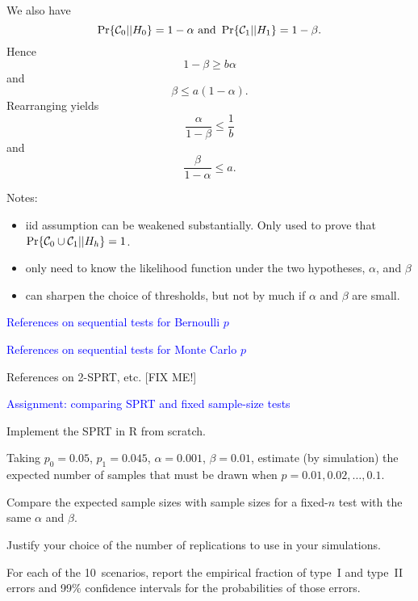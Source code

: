 \documentclass[landscape]{slides}
\newcommand{\cC}{{\cal C}}
\newcommand{\beq}{\begin{equation}}
\newcommand{\eeq}{\end{equation}}
\begin{document}
\begin{slide}
We also have 
\beq
  \Pr \{ \cC_0 || H_0 \} = 1 - \alpha  \mbox{ and } \Pr \{ \cC_1 || H_1 \} = 1- \beta.
\eeq
Hence
\beq
    1 - \beta \ge b \alpha
\eeq
and
\beq
    \beta \le a (1 - \alpha).
\eeq
Rearranging yields
\beq
    \frac{\alpha}{1-\beta} \le \frac{1}{b}
\eeq
and
\beq
    \frac{\beta}{1-\alpha} \le a.
\eeq

\end{slide}

\begin{slide}
Notes:  
\begin{itemize}
    \item iid assumption can be weakened substantially.
             Only used to prove that $\Pr \{ \cC_0 \cup \cC_1 || H_h \} = 1$.
    \item only need to know the likelihood function under the two hypotheses,
             $\alpha$, and $\beta$
    \item can sharpen the choice of thresholds, but not by much if $\alpha$ and
             $\beta$ are small.
\end{itemize}
\end{slide}

\begin{slide}
{\textcolor{blue}{References on sequential tests for Bernoulli $p$}}


\cite{wald45,freemanWeiss64,causey85}

{\textcolor{blue}{References on sequential tests for Monte Carlo $p$}}

\cite{besagClifford91,fayEtal07,fayFollman02}

References on 2-SPRT, etc. [FIX ME!]



\end{slide}

\begin{slide}
{\textcolor{blue}{Assignment: comparing SPRT and fixed sample-size tests}}

Implement the SPRT in R from scratch.

Taking $p_0 = 0.05$, $p_1 = 0.045$, $\alpha = 0.001$, $\beta = 0.01$, estimate (by simulation)
the expected number of samples that must be drawn when $p = 0.01, 0.02, \ldots, 0.1$.

Compare the expected sample sizes with sample sizes for
a fixed-$n$ test with the same $\alpha$ and $\beta$.

Justify your choice of the number of replications to use in your simulations.

For each of the 10~scenarios, report the empirical fraction of type~I and type~II errors
and 99\% confidence intervals for the probabilities of those errors.

\end{slide}
\end{document}
